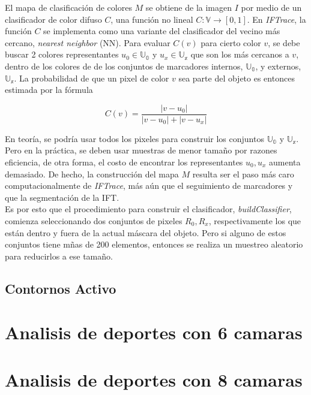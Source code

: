 \documentclass[a4paper,10pt]{article}
\begin{document}
El mapa de clasificación de colores $M$ se obtiene de la imagen $I$ por medio de un
clasificador de color difuso $C$, una función no lineal $C : \mathbb{V} \to [0,1]$.
En \textit{IFTrace}, la función $C$ se implementa como una variante del clasificador
del vecino más cercano, \textit{nearest neighbor} (NN). Para evaluar $C(v)$ para 
cierto color $v$, se debe buscar 2 colores representantes $u_{0} \in \mathbb{U_{0}}$ 
y $u_{x} \in \mathbb{U_{x}}$ que son los más cercanos a $v$, dentro de los colores de
de los conjuntos de marcadores internos, $\mathbb{U_{0}}$, y externos, $\mathbb{U_{x}}$.
La probabilidad de que un pixel de color $v$ sea parte del objeto es entonces estimada
por la fórmula

\begin{equation}
   \label{eq:IFTrace-color-classifier}
   C(v) = \frac{|v - u_{0}|}{|v - u_{0}| + |v - u_{x}|}
\end{equation}

En teoría, se podría usar todos los pixeles para construir los conjuntos 
$\mathbb{U_{0}}$ y $\mathbb{U_{x}}$. Pero en la práctica, se deben usar muestras 
de menor tamaño por razones eficiencia, de otra forma, el costo de encontrar los
representantes $u_{0},u_{x}$ aumenta demasiado. De hecho, la construcción del mapa
$M$ resulta ser el paso más caro computacionalmente de \textit{IFTrace}, más
aún que el seguimiento de marcadores y que la segmentación de la IFT.\\
Es por esto que el procedimiento para construir el clasificador, 
\textit{buildClassifier}, comienza seleccionando dos conjuntos de pixeles 
$R_{0},R_{x}$, respectivamente los que están dentro y fuera de la actual máscara
del objeto. Pero si alguno de estos conjuntos tiene mñas de 200 elementos,
entonces se realiza un muestreo aleatorio para reducirlos a ese tamaño.

\subsection{Contornos Activo}


\section{Analisis de deportes con 6 camaras}
\label{sec:6-camaras}


\section{Analisis de deportes con 8 camaras}
\label{sec:8-camaras}
\end{document}
